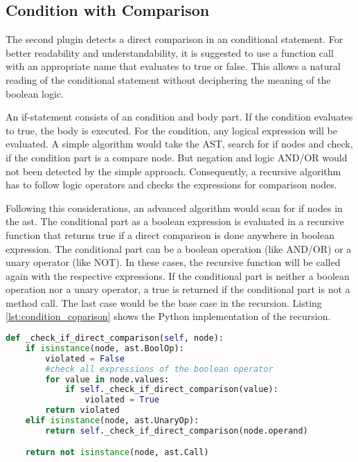\subsection{Condition with Comparison}
The second plugin detects a direct comparison in an conditional statement. For better readability and understandability, it is suggested to use a function call with an appropriate name that evaluates to true or false. This allows a natural reading of the conditional statement without deciphering the meaning of the boolean logic.

An if-statement consists of an condition and body part. If the condition evaluates to true, the body is executed. For the condition, any logical expression will be evaluated. A simple algorithm would take the AST, search for if nodes and check, if the condition part is a compare node. 
But negation and logic AND/OR would not been detected by the simple approach. Consequently, a recursive algorithm has to follow logic operators and checks the expressions for comparison nodes.

Following this considerations, an advanced algorithm would scan for if nodes in the ast. The conditional part as a boolean expression is evaluated in a recursive function that returns true if a direct comparison is done anywhere in boolean expression.
The conditional part can be a boolean operation (like AND/OR) or a unary operator (like NOT).  In these cases, the recursive function will be called again with the respective expressions. If the conditional part is neither a boolean operation nor a unary operator, a true is returned if the conditional part is not a method call. The last case would be the base case in the recursion. Listing \ref{lst:condition_coparison} shows the Python implementation of the recursion.

\begin{lstlisting}[language=Python, label=lst:condition_coparison, caption={Recursive function to analyse an if statement for direct comparisons. Since a condition should contain a method call, the function returns False if this is not the case.}]
def _check_if_direct_comparison(self, node):
    if isinstance(node, ast.BoolOp):
        violated = False
        #check all expressions of the boolean operator
        for value in node.values:
            if self._check_if_direct_comparison(value):
                violated = True
        return violated
    elif isinstance(node, ast.UnaryOp):
        return self._check_if_direct_comparison(node.operand)

    return not isinstance(node, ast.Call)
    \end{lstlisting}

